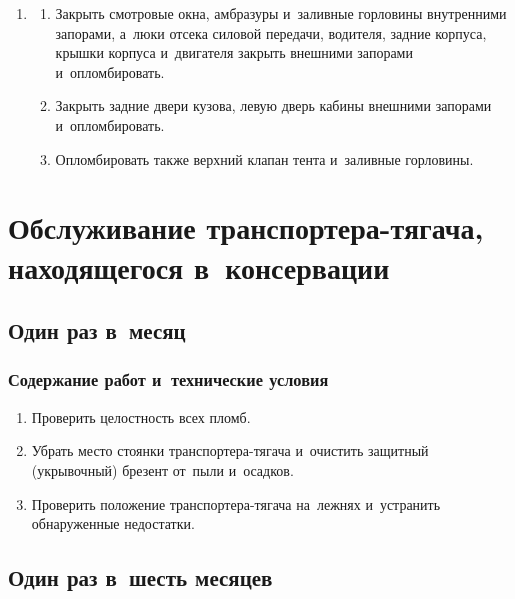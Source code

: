 \begin{enumerate}
    \item \begin{enumerate}
        \item 
        Закрыть смотровые окна, амбразуры и~заливные горловины внутренними запорами, а~люки отсека силовой передачи, водителя, задние корпуса, крышки корпуса и~двигателя закрыть внешними запорами и~опломбировать. 
        \item 
        Закрыть задние двери кузова, левую дверь кабины внешними запорами и~оп\-ломбировать. 
        \item 
        Опломбировать также верхний клапан тента и~заливные горловины. 
\end{enumerate}

\end{enumerate}



\section{Обслуживание транспортера-тягача, находящегося в~консервации} 
\subsection{Один раз в~месяц}
\subsubsection{Содержание работ и~технические условия}
\begin{enumerate}
    \item Проверить целостность всех пломб. 
    \item Убрать место стоянки транспортера-тягача и~очистить защитный (укрывочный) брезент от~пыли и~осадков. 
    \item Проверить положение транспортера-тягача на~лежнях и~устранить обнаруженные недостатки. 
\end{enumerate}



\subsection{Один раз в~шесть месяцев}
